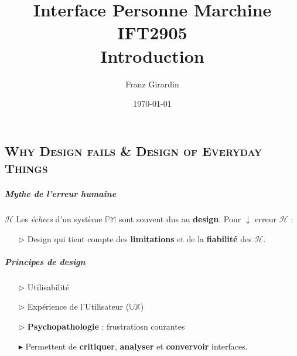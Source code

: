 \documentclass{report}
\title{\Huge{Interface Personne Marchine}\\{IFT2905}\\{\textbf{Introduction}}}
\author{\huge{Franz Girardin}}
\date{\today}
\begin{document}

\pagebreak

\pagebreak
\begin{multicols*}{3}


    \footnotesize

    \chapter{\textsc{Why Design fails \& Design of Everyday Things}}


    \paragraph{Mythe de l'erreur humaine} $\mathcal{H}$   
    Les \textit{échecs} d'un système $\mathbb{PM}$ sont souvent dus  
    au \textbf{design}. Pour $\downarrow$ erreur $\mathcal{H}$ : 
    \begin{itemize}
        \item[$\rhd$ ] Design qui tient compte des \textbf{limitations}
            et de la \textbf{fiabilité} des $\mathcal{H}$.   
    \end{itemize}

    \paragraph{Principes de design}
    \begin{itemize}
        \item[$\rhd$] Utilisabilité
        \item[$\rhd$] Expérience de l'Utilisateur ($\mathbb{UX}$)
        \item[$\rhd$] \textbf{Psychopathologie} : frustratiosn courantes  
         \item[$\blacktriangleright$] Permettent de 
             \textbf{critiquer}, \textbf{analyser} et \textbf{convervoir} interfaces.     

    \end{itemize}



\end{multicols*}
\end{document}
